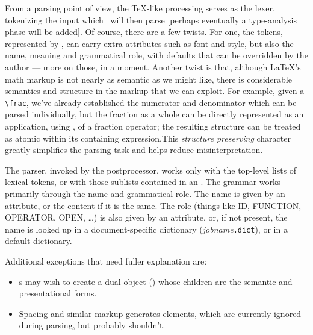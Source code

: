 \documentclass{report}
\begin{document}
From a parsing point of view, the \TeX-like processing serves as the lexer,
tokenizing the input which \LaTeXML\ will then parse
[perhaps eventually a type-analysis phase will be added].
Of course, there are a few twists.
For one, the tokens, represented by , can carry extra attributes
such as font and style, but also the name, meaning and grammatical role,
with defaults that can be overridden by the author --- more on those, in a moment.
Another twist is that, although \LaTeX's math markup is not nearly
as semantic as we might like, there is considerable semantics and structure in the 
markup that we can exploit. For example, given a \verb|\frac|, we've already
established the numerator and denominator which can be parsed individually,
but the fraction as a whole can be directly represented as an application,
using , of a fraction operator; the resulting structure can be treated
as atomic within its containing expression.This \emph{structure preserving} character
greatly simplifies the parsing task and helps reduce misinterpretation.

The parser, invoked by the postprocessor, works only with the top-level lists of lexical tokens,
or with those sublists contained in an .  The grammar works primarily through
the name and grammatical role.  The name is given by an attribute, or the content if it is
the same.  The role (things like ID, FUNCTION, OPERATOR, OPEN, \ldots) is also given
by an attribute, or, if not present, the name is looked up in a document-specific
dictionary (\textit{jobname}\texttt{.dict}), or in a default dictionary.

Additional exceptions that need fuller explanation are: 
\begin{itemize}
 \item {}s may wish to create a dual object () whose children are 
the semantic and presentational forms.
 \item Spacing and similar markup generates  elements, which are currently ignored
during parsing, but probably shouldn't.
\end{itemize}
\end{document}
